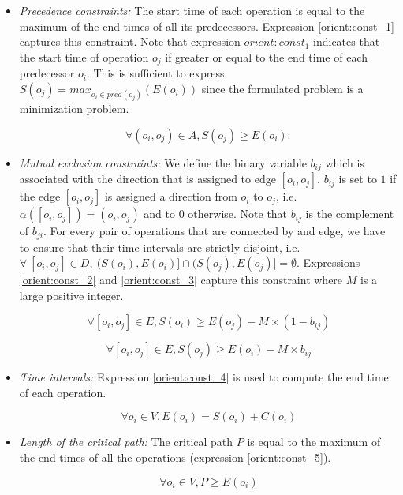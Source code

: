 \begin{itemize}

\item \textit{Precedence constraints:} The start time of each operation is equal to the maximum of the end times of all its predecessors. Expression \ref{orient:const_1} captures this constraint. Note that expression $orient:const_1$ indicates that the start time of operation $o_j$ if greater or equal to the end time of each predecessor $o_i$. This is sufficient to express $S(o_j) = max_{o_i \in pred(o_j)}(E(o_i))$ since the formulated problem is a minimization problem.

\begin{equation}
\forall (o_i,o_j) \in A, S(o_j) \geq E(o_i):
\label{orient:const_1}
\end{equation}

\item \textit{Mutual exclusion constraints:} We define the binary variable $b_{ij}$ which is associated with the direction that is assigned to edge $[o_i,o_j]$. $b_{ij}$ is set to $1$ if the edge $[o_i,o_j]$ is assigned a direction from $o_i$ to $o_j$, i.e. $\alpha([o_i,o_j]) = (o_i,o_j)$ and to $0$ otherwise. Note that $b_{ij}$ is the complement of $b_{ji}$. For every pair of operations that are connected by and edge, we have to ensure that their time intervals are strictly disjoint, i.e. $\forall\ [o_i,o_j] \in D,\  (S(o_i), E(o_i)] \cap (S(o_j), E(o_j)] = \emptyset$. Expressions \ref{orient:const_2} and \ref{orient:const_3} capture this constraint where $M$ is a large positive integer.

\begin{equation}
\forall [o_i,o_j] \in E, S(o_i) \geq E(o_j) - M \times (1-b_{ij})
\label{orient:const_2}
\end{equation} 

\begin{equation}
\forall [o_i,o_j] \in E, S(o_j) \geq E(o_i) - M \times b_{ij}
\label{orient:const_3}
\end{equation}

\item \textit{Time intervals:} Expression \ref{orient:const_4} is used to compute the end time of each operation.

\begin{equation}
\forall o_i \in V, E(o_i) = S(o_i) + C(o_i)
\label{orient:const_4}
\end{equation} 

\item \textit{Length of the critical path:} The critical path $P$ is equal to the maximum of the end times of all the operations (expression \ref{orient:const_5}).

\begin{equation}
\forall o_i \in V, P \geq E(o_i)
\label{orient:const_5}
\end{equation}

\end{itemize}

